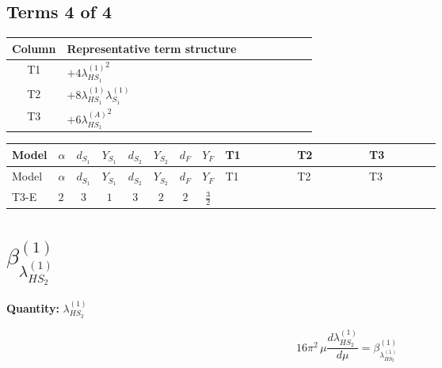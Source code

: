 \documentclass[8pt]{article}
\begin{document}
\begin{landscape}
\subsection*{Terms 4 of 4}
\begin{center}
\begin{tabular}{@{}c >{\raggedright\arraybackslash}p{0.82\linewidth}@{}}
\toprule
Column & Representative term structure \\
\midrule
T1 & \(\displaystyle +4 {\lambda_{HS_1}^{(1)}}^2\) \\
\midrule
T2 & \(\displaystyle +8 {\lambda_{HS_1}^{(1)}} {\lambda_{S_1}^{(1)}}\) \\
\midrule
T3 & \(\displaystyle +6 {\lambda_{HS_1}^{(A)}}^2\) \\
\midrule
\bottomrule
\end{tabular}
\end{center}
\smallskip
\tiny
\begin{longtable}{@{}llcccccc >{\raggedright\arraybackslash}p{0.21\linewidth} >{\raggedright\arraybackslash}p{0.21\linewidth} >{\raggedright\arraybackslash}p{0.21\linewidth}@{}}
\toprule
Model & $\alpha$ & $d_{S_1}$ & $Y_{S_1}$ & $d_{S_2}$ & $Y_{S_2}$ & $d_F$ & $Y_F$ & T1 & T2 & T3 \\
\midrule
\endfirsthead
\toprule
Model & $\alpha$ & $d_{S_1}$ & $Y_{S_1}$ & $d_{S_2}$ & $Y_{S_2}$ & $d_F$ & $Y_F$ & T1 & T2 & T3 \\
\midrule
\endhead
T3-E & $2$ & $3$ & $1$ & $3$ & $2$ & $2$ & $\frac{3}{2}$ & \scriptsize\adjustbox{max width=\linewidth}{$\begin{gathered} +4 {\lambda_{HS_1}^{(1)}}^2\end{gathered}$} & \scriptsize\adjustbox{max width=\linewidth}{$\begin{gathered} +8 {\lambda_{HS_1}^{(1)}} {\lambda_{S_1}^{(1)}}\end{gathered}$} & \scriptsize\adjustbox{max width=\linewidth}{$\begin{gathered} +6 {\lambda_{HS_1}^{(A)}}^2\end{gathered}$} \\
\midrule
\bottomrule
\end{longtable}
\clearpage
\section*{$\beta_{\lambda_{HS_2}^{(1)}}^{(1)}$}
\noindent\textbf{Quantity: }$\lambda_{HS_2}^{(1)}$\par\smallskip
\[16\pi^2\,\mu\frac{d \lambda_{HS_2}^{(1)}}{d\mu}=\beta_{\lambda_{HS_2}^{(1)}}^{(1)}\]

\end{landscape}
\end{document}
